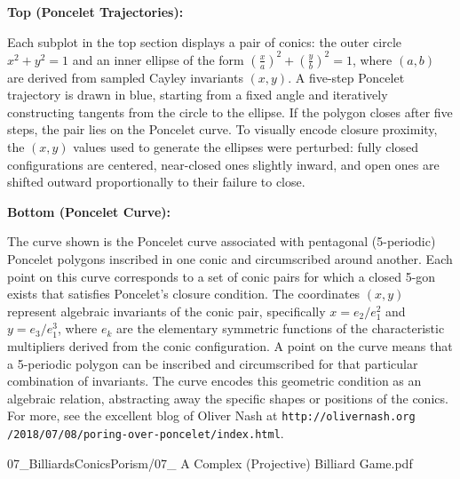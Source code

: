 \begin{SideNotePage}{
  \textbf{Top (Poncelet Trajectories):} \par
  Each subplot in the top section displays a pair of conics: the outer circle $x^2 + y^2 = 1$ and an inner ellipse of the form $\left(\frac{x}{a}\right)^2 + \left(\frac{y}{b}\right)^2 = 1$, where $(a, b)$ are derived from sampled Cayley invariants $(x, y)$. A five-step Poncelet trajectory is drawn in blue, starting from a fixed angle and iteratively constructing tangents from the circle to the ellipse. If the polygon closes after five steps, the pair lies on the Poncelet curve. To visually encode closure proximity, the $(x, y)$ values used to generate the ellipses were perturbed: fully closed configurations are centered, near-closed ones slightly inward, and open ones are shifted outward proportionally to their failure to close.

  \vspace{1.5em}
  \textbf{Bottom (Poncelet Curve):} \par
  The curve shown is the Poncelet curve associated with pentagonal (5-periodic) Poncelet polygons inscribed in one conic and circumscribed around another. Each point on this curve corresponds to a set of conic pairs for which a closed 5-gon exists that satisfies Poncelet’s closure condition. The coordinates $(x, y)$ represent algebraic invariants of the conic pair, specifically $x = e_2 / e_1^2$ and $y = e_3 / e_1^3$, where $e_k$ are the elementary symmetric functions of the characteristic multipliers derived from the conic configuration. A point on the curve means that a 5-periodic polygon can be inscribed and circumscribed for that particular combination of invariants. The curve encodes this geometric condition as an algebraic relation, abstracting away the specific shapes or positions of the conics. For more, see the excellent blog of Oliver Nash at \texttt{http://olivernash.org\\/2018/07/08/poring-over-poncelet/index.html}.
}{07_BilliardsConicsPorism/07_ A Complex (Projective) Billiard Game.pdf}
\end{SideNotePage}